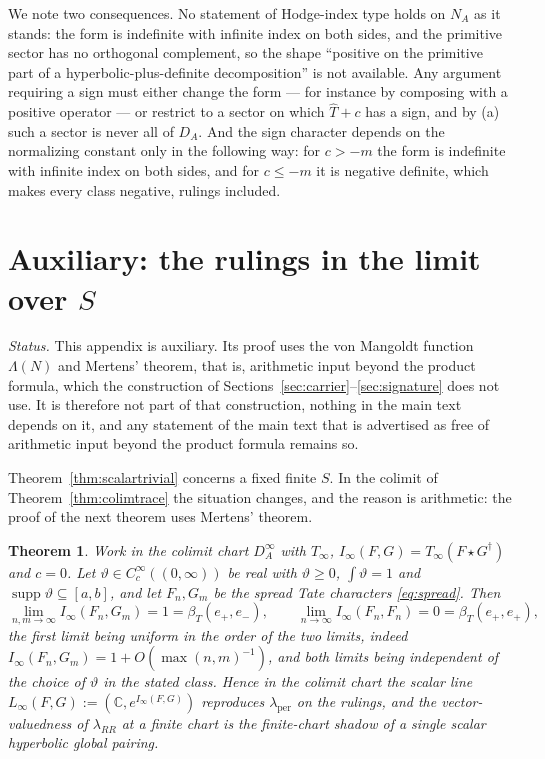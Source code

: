 \documentclass[11pt]{amsart}
\newtheorem{theorem}{Theorem}[section]
\theoremstyle{definition}
\theoremstyle{remark}
\newcommand{\C}{\mathbb C}
\newcommand{\supp}{\operatorname{supp}}
\newcommand{\Th}{\widehat{T}}
\newcommand{\DA}{D_A}
\begin{document}
We note two consequences.  No statement of Hodge-index type holds on $N_A$ as
it stands: the form is indefinite with infinite
index on both sides, and the primitive sector has no orthogonal complement, so
the shape ``positive on the primitive part of a hyperbolic-plus-definite
decomposition'' is not available.  Any argument requiring a sign must either
change the form --- for instance by composing with a positive operator --- or
restrict to a sector on which $\Th+c$ has a sign, and by (a) such a sector is
never all of $\DA$.  And the sign character depends on the normalizing constant
only in the following way: for $c>-m$ the form is indefinite with infinite index
on both sides, and for $c\le-m$ it is negative definite, which makes every
class negative, rulings included.

\appendix

\section{Auxiliary: the rulings in the limit over \texorpdfstring{$S$}{S}}\label{app:mertens}

\emph{Status.}  This appendix is auxiliary.  Its proof uses the von Mangoldt
function $\Lambda(N)$ and Mertens' theorem, that is, arithmetic input beyond
the product formula, which the construction of
Sections~\ref{sec:carrier}--\ref{sec:signature} does not use.  It is therefore
not part of that construction, nothing in the main text depends on it, and
any statement of the main text that is advertised as free of arithmetic input
beyond the product formula remains so.

Theorem~\ref{thm:scalartrivial} concerns a fixed finite $S$.  In the colimit of
Theorem~\ref{thm:colimtrace} the situation changes, and the reason is
arithmetic: the proof of the next theorem uses Mertens' theorem.

\begin{theorem}\label{thm:mertens}
Work in the colimit chart $\DA^{\infty}$ with $T_{\infty}$,
$I_{\infty}(F,G)=T_{\infty}(F\star G^{\dagger})$ and $c=0$.  Let $\vartheta\in
C_c^{\infty}((0,\infty))$ be real with $\vartheta\ge0$, $\int\vartheta=1$ and
$\supp\vartheta\subseteq[a,b]$, and let $F_n,G_m$ be the spread Tate characters
\eqref{eq:spread}.  Then
\begin{equation}\label{eq:mertenslimit}
\lim_{n,m\to\infty}I_{\infty}(F_n,G_m)=1=\beta_T(e_+,e_-),\qquad
\lim_{n\to\infty}I_{\infty}(F_n,F_n)=0=\beta_T(e_+,e_+),
\end{equation}
the first limit being uniform in the order of the two limits, indeed
$I_{\infty}(F_n,G_m)=1+O(\max(n,m)^{-1})$, and both limits being independent of
the choice of $\vartheta$ in the stated class.  Hence in the colimit chart the
scalar line $L_{\infty}(F,G):=(\C,e^{I_{\infty}(F,G)})$ reproduces
$\lambda_{\mathrm{per}}$ on the rulings, and the vector-valuedness of
$\lambda_{RR}$ at a finite chart is the finite-chart shadow of a single scalar
hyperbolic global pairing.
\end{theorem}
\end{document}
